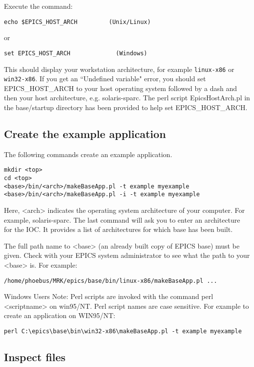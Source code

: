 Execute the command:

\begin{verbatim}echo $EPICS_HOST_ARCH         (Unix/Linux)
\end{verbatim}or

\begin{verbatim}set EPICS_HOST_ARCH             (Windows)
\end{verbatim}This should display your workstation architecture, for example \verb|linux-x86| or \verb|win32-x86|. If you get an ``Undefined 
variable" error, you should set EPICS\_HOST\_ARCH to your host operating system followed by a dash and then your host 
architecture, e.g.  solaris-sparc. The perl script EpicsHostArch.pl in the base/startup directory has been provided to help 
set EPICS\_HOST\_ARCH.

\subsection{Create the example application}

The following commands create an example application.

\begin{verbatim}mkdir <top>
cd <top>
<base>/bin/<arch>/makeBaseApp.pl -t example myexample
<base>/bin/<arch>/makeBaseApp.pl -i -t example myexample
\end{verbatim}Here, \textless{}arch\textgreater{} indicates the operating system architecture of your computer.  For example, solaris-sparc. The last command 
will ask you to enter an architecture for the IOC. It provides a list of architectures for which base has been built.

The full path name to \textless{}base\textgreater{} (an already built copy of EPICS base) must be given. Check with your EPICS system 
administrator to see what the path to your \textless{}base\textgreater{} is. For example:

\begin{verbatim}/home/phoebus/MRK/epics/base/bin/linux-x86/makeBaseApp.pl ...
\end{verbatim}Windows Users Note: Perl scripts are invoked with the command perl \textless{}scriptname\textgreater{} on win95/NT. Perl script names are 
case sensitive. For example to create an application on WIN95/NT:

\begin{verbatim}perl C:\epics\base\bin\win32-x86\makeBaseApp.pl -t example myexample
\end{verbatim}\subsection{Inspect files}

